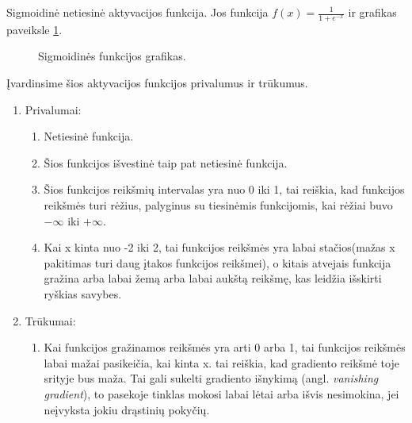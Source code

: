 Sigmoidinė netiesinė aktyvacijos funkcija. Jos funkcija $f(x)=\frac{1}{1+e^{-x}}$ ir grafikas paveiksle \ref{fig:sigmoid}.
\begin{figure}[h!]
  \centering
{}
\caption{Sigmoidinės funkcijos grafikas.}
\label{fig:sigmoid}
\end{figure}

Įvardinsime šios aktyvacijos funkcijos privalumus ir trūkumus. \cite{Avinash2017}
\begin{enumerate}
  \item Privalumai:
  \begin{enumerate}
    \item Netiesinė funkcija.
    \item Šios funkcijos išvestinė taip pat netiesinė funkcija.
    \item Šios funkcijos reikšmių intervalas yra nuo 0 iki 1, tai reiškia, kad funkcijos reikšmės turi rėžius, palyginus su tiesinėmis funkcijomis, kai rėžiai buvo $-\infty$ iki $+\infty$.
    \item Kai x kinta nuo -2 iki 2, tai funkcijos reikšmės yra labai stačios(mažas x pakitimas turi daug įtakos funkcijos reikšmei), o kitais atvejais funkcija gražina arba labai žemą arba labai aukštą reikšmę, kas leidžia išskirti ryškias savybes.
  \end{enumerate}
  \item Trūkumai:
  \begin{enumerate}
    \item Kai funkcijos gražinamos reikšmės yra arti 0 arba 1, tai funkcijos reikšmės labai mažai pasikeičia, kai kinta x. tai reiškia, kad gradiento reikšmė toje srityje bus maža. Tai gali sukelti gradiento išnykimą (angl. \textit{vanishing gradient}), to pasekoje tinklas mokosi labai lėtai arba išvis nesimokina, jei neįvyksta jokiu drąstinių pokyčių.
  \end{enumerate}
\end{enumerate}


